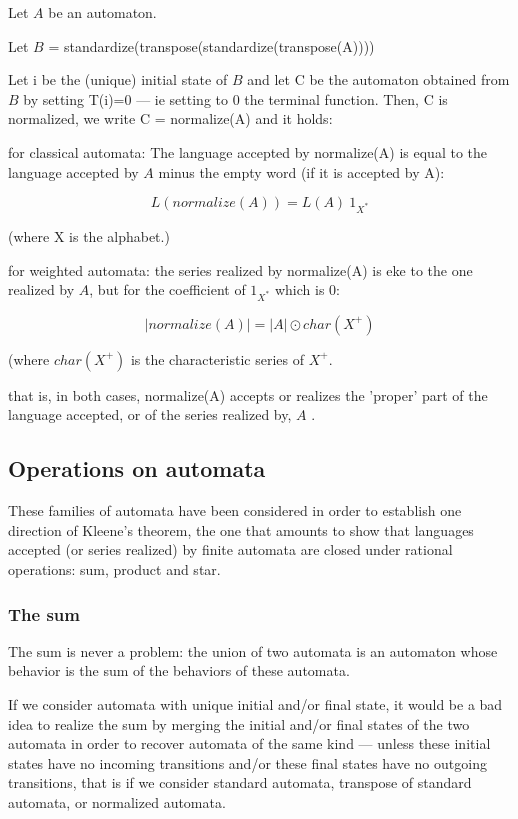 Let $A$ be an automaton.

Let $B$ = standardize(transpose(standardize(transpose(A))))

Let i be the (unique) initial state of $B$ and let C be the automaton
obtained from $B$ by setting T(i)=0 --- ie setting to 0 the terminal
function. Then, C is normalized, we write C = normalize(A) and it
holds:

for classical automata: The language accepted by normalize(A) is equal
to the language accepted by $A$ minus the empty word (if it is accepted
by A):

\begin{displaymath}
  L(normalize(A))  =  L(A) \ 1_{X^*}
\end{displaymath}

\noindent
(where  X  is the alphabet.)

for weighted automata: the series realized by normalize(A) is eke to
the one realized by $A$, but for the coefficient of $1_{X^*}$ which is 0:

\begin{displaymath}
  |normalize(A)|  =  |A| \odot  char(X^+)
\end{displaymath}

\noindent
(where  $char(X^+)$  is the characteristic series of  $X^+$.

that is, in both cases, normalize(A) accepts or realizes the 'proper'
part of the language accepted, or of the series realized by, $A$ .

\subsection{Operations on automata}

These families of automata have been considered in order to establish
one direction of Kleene's theorem, the one that amounts to show that
languages accepted (or series realized) by finite automata are closed
under rational operations: sum, product and star.

\subsubsection{The sum}

The sum is never a problem: the union of two automata is an automaton
whose behavior is the sum of the behaviors of these automata.

\begin{remark}
  If we consider automata with unique initial and/or final state, it
  would be a bad idea to realize the sum by merging the initial and/or
  final states of the two automata in order to recover automata of the
  same kind --- unless these initial states have no incoming
  transitions and/or these final states have no outgoing transitions,
  that is if we consider standard automata, transpose of standard
  automata, or normalized automata.
\end{remark}
